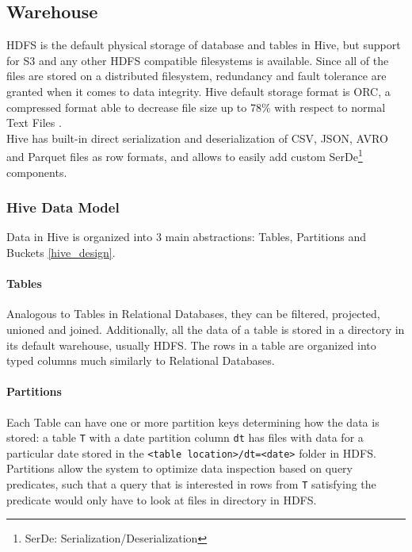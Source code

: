 \subsection{Warehouse}
HDFS is the default physical storage of database and tables in Hive, but support for S3 and any other HDFS compatible filesystems is available. Since all of the files are stored on a distributed filesystem, redundancy and fault tolerance are granted when it comes to data integrity. Hive default storage format is ORC, a compressed format able to decrease file size up to 78\% with respect to normal Text Files \cite{orc_format}.\\
Hive has built-in direct serialization and deserialization of CSV, JSON, AVRO and Parquet files as row formats, and allows to easily add custom SerDe\footnote{SerDe: Serialization/Deserialization} components.

\subsubsection{Hive Data Model}

Data in Hive is organized into 3 main abstractions: Tables, Partitions and Buckets \ref{hive_design}.

\paragraph{Tables} Analogous to Tables in Relational Databases, they can be filtered, projected, unioned and joined. Additionally, all the data of a table is stored in a directory in its default warehouse, usually HDFS. The rows in a table are organized into typed columns much similarly to Relational Databases.
\paragraph{Partitions} Each Table can have one or more partition keys determining how the data is stored: a table \texttt{T} with a date partition column \texttt{dt} has files with data for a particular date stored in the \texttt{<table location>/dt=<date>} folder in HDFS. Partitions allow the system to optimize data inspection based on query predicates, such that a query that is interested in rows from \texttt{T} satisfying the predicate \texttt{} would only have to look at files in \texttt{} directory in HDFS.
